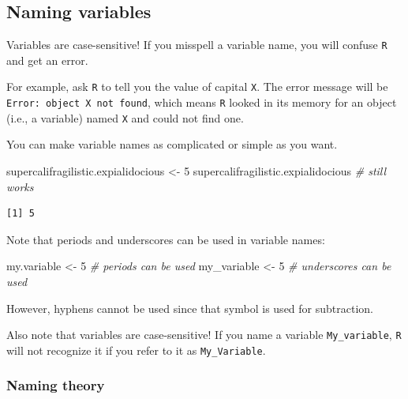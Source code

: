 \documentclass[
]{book}
\newenvironment{Shaded}{\begin{snugshade}}{\end{snugshade}}
\newcommand{\CommentTok}[1]{\textcolor[rgb]{0.56,0.35,0.01}{\textit{#1}}}
\newcommand{\DecValTok}[1]{\textcolor[rgb]{0.00,0.00,0.81}{#1}}
\newcommand{\NormalTok}[1]{#1}
\newcommand{\StringTok}[1]{\textcolor[rgb]{0.31,0.60,0.02}{#1}}
\begin{document}
\hypertarget{naming-variables}{%
\subsection*{Naming variables}\label{naming-variables}}

Variables are case-sensitive! If you misspell a variable name, you will confuse \texttt{R} and get an error.

For example, ask \texttt{R} to tell you the value of capital \texttt{X}. The error message will be \texttt{Error:\ object\ \textquotesingle{}X\textquotesingle{}\ not\ found}, which means \texttt{R} looked in its memory for an object (i.e., a variable) named \texttt{X} and could not find one.

You can make variable names as complicated or simple as you want.

\begin{Shaded}
\begin{Highlighting}[]
\NormalTok{supercalifragilistic.expialidocious <-}\StringTok{ }\DecValTok{5}
\NormalTok{supercalifragilistic.expialidocious  }\CommentTok{# still works}
\end{Highlighting}
\end{Shaded}

\begin{verbatim}
[1] 5
\end{verbatim}

Note that periods and underscores can be used in variable names:

\begin{Shaded}
\begin{Highlighting}[]
\NormalTok{my.variable <-}\StringTok{ }\DecValTok{5} \CommentTok{# periods can be used}
\NormalTok{my_variable <-}\StringTok{ }\DecValTok{5} \CommentTok{# underscores can be used}
\end{Highlighting}
\end{Shaded}

However, hyphens cannot be used since that symbol is used for subtraction.

Also note that variables are case-sensitive! If you name a variable \texttt{My\_variable}, \texttt{R} will not recognize it if you refer to it as \texttt{My\_Variable}.

\hypertarget{naming-theory}{%
\subsubsection*{Naming theory}\label{naming-theory}}
\end{document}
